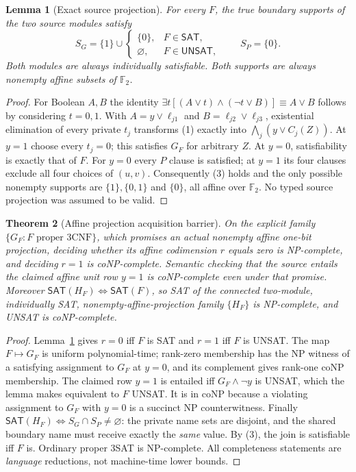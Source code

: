 \documentclass[11pt]{article}
\newtheorem{theorem}{Theorem}
\newtheorem{lemma}[theorem]{Lemma}
\newcommand{\SAT}{\mathsf{SAT}}
\newcommand{\UNSAT}{\mathsf{UNSAT}}
\newcommand{\Ftwo}{\mathbb F_2}
\begin{document}
\begin{lemma}[Exact source projection]
\label{lem:proj}
For every $F$, the true boundary supports of
the two source modules satisfy
\begin{equation}
S_G=\{1\}\cup
\begin{cases}\{0\},&F\in\SAT,\\
\varnothing,&F\in\UNSAT,\end{cases}
\qquad S_P=\{0\}.
\tag{3}
\end{equation}
Both modules are always individually satisfiable.
Both supports are always nonempty affine subsets of
$\Ftwo$.
\end{lemma}
\begin{proof}
For Boolean $A,B$ the identity
$\exists t[(A\vee t)\wedge(\neg t\vee B)]
\equiv A\vee B$ follows by considering $t=0,1$.
With $A=y\vee\ell_{j1}$ and
$B=\ell_{j2}\vee\ell_{j3}$, existential
elimination of every private $t_j$ transforms (1)
exactly into $\bigwedge_j(y\vee C_j(Z))$.
At $y=1$ choose every $t_j=0$; this satisfies
$G_F$ for arbitrary $Z$. At $y=0$, satisfiability
is exactly that of $F$. For $y=0$ every $P$
clause is satisfied; at $y=1$ its four clauses
exclude all four choices of $(u,v)$.
Consequently (3) holds and the only possible
nonempty supports are $\{1\},\{0,1\}$ and
$\{0\}$, all affine over $\Ftwo$.
No typed source projection was assumed to be valid.
\end{proof}

\begin{theorem}[Affine projection acquisition barrier]
\label{th:hard}
On the explicit family $\{G_F:F\text{ proper 3CNF}\}$,
which promises an \emph{actual nonempty affine} one-bit
projection, deciding whether its affine codimension
$r$ equals zero is NP-complete, and deciding $r=1$
is coNP-complete. Semantic checking that the source
entails the claimed affine unit row $y=1$ is
coNP-complete even under that promise.
Moreover $\SAT(H_F)\iff\SAT(F)$, so SAT of
the connected two-module, individually SAT,
nonempty-affine-projection family $\{H_F\}$
is NP-complete, and UNSAT is coNP-complete.
\end{theorem}
\begin{proof}
Lemma~\ref{lem:proj} gives $r=0$ iff $F$ is SAT
and $r=1$ iff $F$ is UNSAT. The map $F\mapsto G_F$
is uniform polynomial-time; rank-zero membership
has the NP witness of a satisfying assignment to
$G_F$ at $y=0$, and its complement gives rank-one
coNP membership. The claimed row $y=1$ is entailed
iff $G_F\wedge\neg y$ is UNSAT, which the
lemma makes equivalent to $F$ UNSAT. It is in coNP
because a violating assignment to $G_F$ with $y=0$
is a succinct NP counterwitness. Finally
$\SAT(H_F)\iff S_G\cap S_P\ne\varnothing$:
the private name sets are disjoint, and the shared
boundary name must receive exactly the \emph{same}
value. By (3), the join is satisfiable iff $F$ is.
Ordinary proper 3SAT is NP-complete. All completeness
statements are \emph{language} reductions, not
machine-time lower bounds.
\end{proof}
\end{document}
